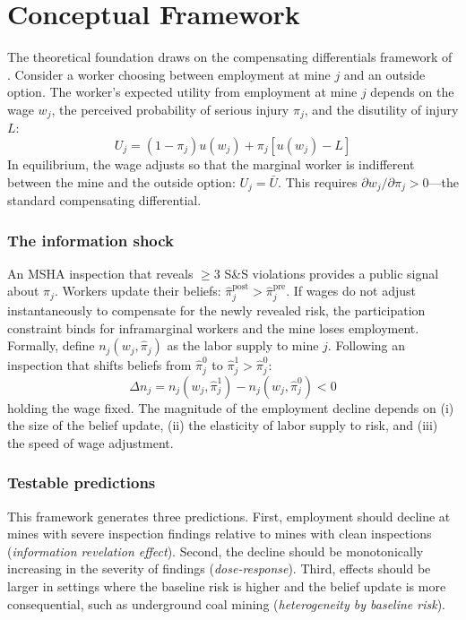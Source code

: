 \documentclass[12pt]{article}
\begin{document}
\section{Conceptual Framework}

The theoretical foundation draws on the compensating differentials framework of \citet{rosen1986theory}. Consider a worker choosing between employment at mine $j$ and an outside option. The worker's expected utility from employment at mine $j$ depends on the wage $w_j$, the perceived probability of serious injury $\pi_j$, and the disutility of injury $L$:
\begin{equation}
U_j = (1 - \pi_j) u(w_j) + \pi_j [u(w_j) - L]
\label{eq:utility}
\end{equation}
In equilibrium, the wage adjusts so that the marginal worker is indifferent between the mine and the outside option: $U_j = \bar{U}$. This requires $\partial w_j / \partial \pi_j > 0$---the standard compensating differential.

\subsubsection*{The information shock} An MSHA inspection that reveals $\geq$3 S\&S violations provides a public signal about $\pi_j$. Workers update their beliefs: $\hat{\pi}_j^{\text{post}} > \hat{\pi}_j^{\text{pre}}$. If wages do not adjust instantaneously to compensate for the newly revealed risk, the participation constraint binds for inframarginal workers and the mine loses employment. Formally, define $n_j(w_j, \hat{\pi}_j)$ as the labor supply to mine $j$. Following an inspection that shifts beliefs from $\hat{\pi}_j^0$ to $\hat{\pi}_j^1 > \hat{\pi}_j^0$:
\begin{equation}
\Delta n_j = n_j(w_j, \hat{\pi}_j^1) - n_j(w_j, \hat{\pi}_j^0) < 0
\label{eq:labor_supply}
\end{equation}
holding the wage fixed. The magnitude of the employment decline depends on (i) the size of the belief update, (ii) the elasticity of labor supply to risk, and (iii) the speed of wage adjustment.

\subsubsection*{Testable predictions} This framework generates three predictions. First, employment should decline at mines with severe inspection findings relative to mines with clean inspections (\textit{information revelation effect}). Second, the decline should be monotonically increasing in the severity of findings (\textit{dose-response}). Third, effects should be larger in settings where the baseline risk is higher and the belief update is more consequential, such as underground coal mining (\textit{heterogeneity by baseline risk}).
\end{document}
